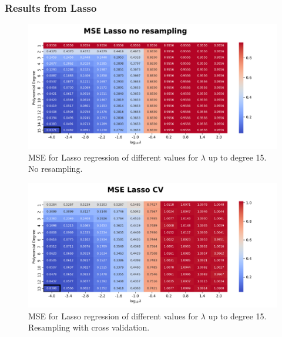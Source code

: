 \documentclass{article}
\begin{document}
\subsubsection{Results from Lasso}
\begin{figure}[htbp]
    \centering
    \includegraphics[width=\textwidth]{Project1/figures/Terrain/Heatmap_MSE_Lasso_no_resampling.png}
    \caption{MSE for Lasso regression of different values for $\lambda$ up to degree 15. No resampling.}
    \label{fig:TerrainLassoNoResamp}
\end{figure}

\begin{figure}[htbp]
    \centering
    \includegraphics[width=\textwidth]{Project1/figures/Terrain/Heatmap_MSE_Lasso_CV.png}
    \caption{MSE for Lasso regression of different values for $\lambda$ up to degree 15. Resampling with cross validation.}
    \label{fig:TerrainLassoCV}
\end{figure}
\end{document}
